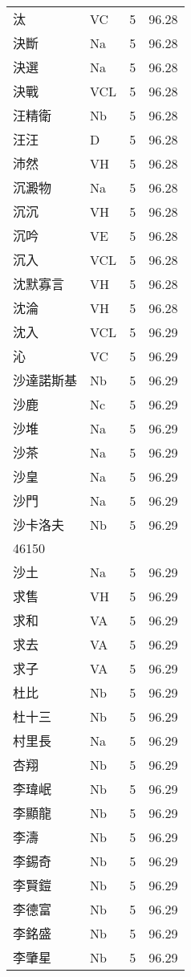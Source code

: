 \documentclass[twocolumn]{book}
\begin{document}
\begin{supertabular}{llrr}
汰 & VC & 5 &  96.28\\
決斷 & Na & 5 &  96.28\\
決選 & Na & 5 &  96.28\\
決戰 & VCL & 5 &  96.28\\
汪精衛 & Nb & 5 &  96.28\\
汪汪 & D & 5 &  96.28\\
沛然 & VH & 5 &  96.28\\
沉澱物 & Na & 5 &  96.28\\
沉沉 & VH & 5 &  96.28\\
沉吟 & VE & 5 &  96.28\\
沉入 & VCL & 5 &  96.28\\
沈默寡言 & VH & 5 &  96.28\\
沈淪 & VH & 5 &  96.28\\
沈入 & VCL & 5 &  96.29\\
沁 & VC & 5 &  96.29\\
沙達諾斯基 & Nb & 5 &  96.29\\
沙鹿 & Nc & 5 &  96.29\\
沙堆 & Na & 5 &  96.29\\
沙茶 & Na & 5 &  96.29\\
沙皇 & Na & 5 &  96.29\\
沙門 & Na & 5 &  96.29\\
沙卡洛夫 & Nb & 5 &  96.29\\
46150\\
沙土 & Na & 5 &  96.29\\
求售 & VH & 5 &  96.29\\
求和 & VA & 5 &  96.29\\
求去 & VA & 5 &  96.29\\
求子 & VA & 5 &  96.29\\
杜比 & Nb & 5 &  96.29\\
杜十三 & Nb & 5 &  96.29\\
村里長 & Na & 5 &  96.29\\
杏翔 & Nb & 5 &  96.29\\
李瑋岷 & Nb & 5 &  96.29\\
李顯龍 & Nb & 5 &  96.29\\
李濤 & Nb & 5 &  96.29\\
李錫奇 & Nb & 5 &  96.29\\
李賢鎧 & Nb & 5 &  96.29\\
李德富 & Nb & 5 &  96.29\\
李銘盛 & Nb & 5 &  96.29\\
李肇星 & Nb & 5 &  96.29\\

\end{supertabular}
\end{document}
